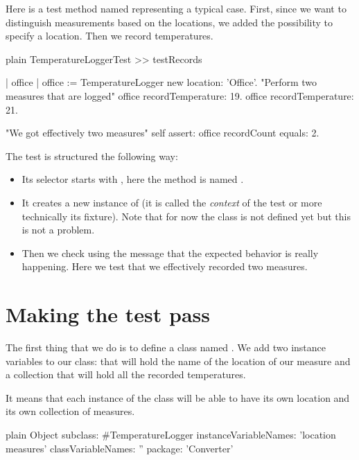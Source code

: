 \documentclass[10pt,twoside,english]{_support/latex/sbabook/sbabook}
\begin{document}
Here is a test method named  representing a typical case. First, since we want to distinguish measurements based on the locations, we added the possibility to specify a location. Then we record temperatures.

\begin{displaycode}{plain}
TemperatureLoggerTest >> testRecords

    | office |
    office := TemperatureLogger new location: 'Office'.
    "Perform two measures that are logged"
    office recordTemperature: 19.
    office recordTemperature: 21.

    "We got effectively two measures"
    self assert: office recordCount equals: 2.
\end{displaycode}

The test is structured the following way:

\begin{itemize}
\item Its selector starts with , here the method is named .
\item It creates a new instance of  (it is called the \textit{context} of the test or more technically its fixture). Note that for now the class  is not defined yet but this is not a problem.
\item Then we check using the message  that the expected behavior is really happening. Here we test that we effectively recorded two measures.
\end{itemize}
\section{Making the test pass}
The first thing that we do is to define a class named .
We add two instance variables to our class:  that will hold the name of the location of our measure and  a collection that will hold all the recorded temperatures.

It means that each instance of the class  will be able to have its own location and its own collection of measures.

\begin{displaycode}{plain}
Object subclass: #TemperatureLogger
    instanceVariableNames: 'location measures'
    classVariableNames: ''
    package: 'Converter'
\end{displaycode}
\end{document}
